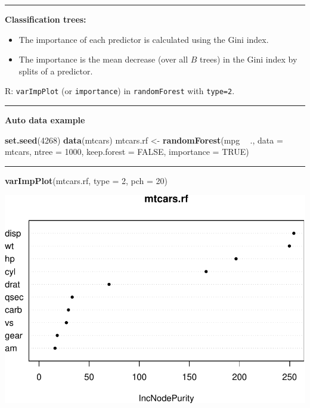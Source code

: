 \documentclass[]{article}
\newenvironment{Shaded}{\begin{snugshade}}{\end{snugshade}}
\newcommand{\DataTypeTok}[1]{\textcolor[rgb]{0.13,0.29,0.53}{#1}}
\newcommand{\DecValTok}[1]{\textcolor[rgb]{0.00,0.00,0.81}{#1}}
\newcommand{\KeywordTok}[1]{\textcolor[rgb]{0.13,0.29,0.53}{\textbf{#1}}}
\newcommand{\NormalTok}[1]{#1}
\newcommand{\OperatorTok}[1]{\textcolor[rgb]{0.81,0.36,0.00}{\textbf{#1}}}
\newcommand{\OtherTok}[1]{\textcolor[rgb]{0.56,0.35,0.01}{#1}}
\newcommand{\StringTok}[1]{\textcolor[rgb]{0.31,0.60,0.02}{#1}}
\providecommand{\tightlist}{%
  \setlength{\itemsep}{0pt}\setlength{\parskip}{0pt}}
\begin{document}
\begin{center}\rule{0.5\linewidth}{\linethickness}\end{center}

\textbf{Classification trees:}

\begin{itemize}
\tightlist
\item
  The importance of each predictor is calculated using the Gini index.
\item
  The importance is the mean decrease (over all \(B\) trees) in the Gini
  index by splits of a predictor.
\end{itemize}

R: \texttt{varImpPlot} (or \texttt{importance}) in \texttt{randomForest}
with \texttt{type=2}.

\begin{center}\rule{0.5\linewidth}{\linethickness}\end{center}

\textbf{Auto data example}

\begin{Shaded}
\begin{Highlighting}[]
\KeywordTok{set.seed}\NormalTok{(}\DecValTok{4268}\NormalTok{)}
\KeywordTok{data}\NormalTok{(mtcars)}
\NormalTok{mtcars.rf <-}\StringTok{ }\KeywordTok{randomForest}\NormalTok{(mpg }\OperatorTok{~}\StringTok{ }\NormalTok{., }\DataTypeTok{data =}\NormalTok{ mtcars, }\DataTypeTok{ntree =} \DecValTok{1000}\NormalTok{, }\DataTypeTok{keep.forest =} \OtherTok{FALSE}\NormalTok{, }
    \DataTypeTok{importance =} \OtherTok{TRUE}\NormalTok{)}
\end{Highlighting}
\end{Shaded}

\begin{center}\rule{0.5\linewidth}{\linethickness}\end{center}

\begin{Shaded}
\begin{Highlighting}[]
\KeywordTok{varImpPlot}\NormalTok{(mtcars.rf, }\DataTypeTok{type =} \DecValTok{2}\NormalTok{, }\DataTypeTok{pch =} \DecValTok{20}\NormalTok{)}
\end{Highlighting}
\end{Shaded}

\includegraphics{8Trees_files/figure-latex/unnamed-chunk-29-1.pdf}
\end{document}
